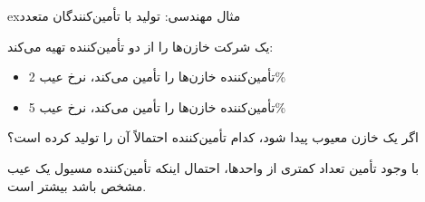 \begin{PSbox}[unbreakable]{ex}{مثال مهندسی: تولید با تأمین‌کنندگان متعدد}

یک شرکت خازن‌ها را از دو تأمین‌کننده تهیه می‌کند:

\begin{itemize}
\tightlist
\item
  تأمین‌کننده  خازن‌ها را تأمین می‌کند، نرخ عیب 2\%
\item
  تأمین‌کننده  خازن‌ها را تأمین می‌کند، نرخ عیب 5\%
\end{itemize}

\PSbr{}\PSbr{}

اگر یک خازن معیوب پیدا شود، کدام تأمین‌کننده احتمالاً آن را تولید کرده است؟

\PSbr{}

با وجود تأمین تعداد کمتری از واحدها، احتمال اینکه تأمین‌کننده  مسیول یک عیب مشخص باشد بیشتر است.

\end{PSbox}


